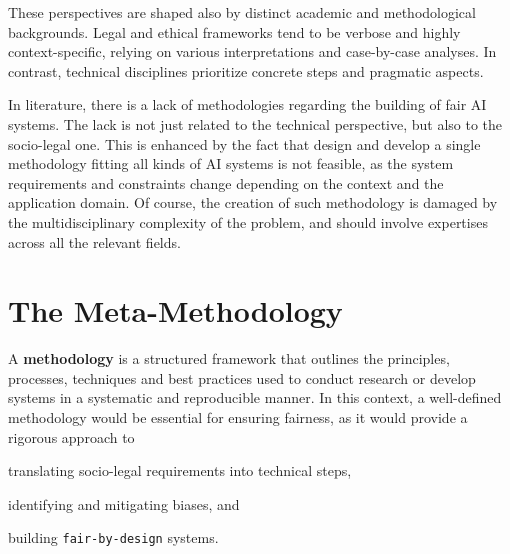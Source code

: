 \documentclass[12pt,a4paper,openright,twoside]{book}
\begin{document}

These perspectives are shaped also by distinct academic and methodological backgrounds.
%
Legal and ethical frameworks tend to be verbose and highly context-specific, relying on various interpretations and case-by-case analyses.
%
In contrast, technical disciplines prioritize concrete steps and pragmatic aspects.


In literature, there is a lack of methodologies regarding the building of fair \ac{AI} systems.
%
The lack is not just related to the technical perspective, but also to the socio-legal one.
%
This is enhanced by the fact that design and develop a single methodology fitting all kinds of \ac{AI} systems is not feasible, as the system requirements and constraints change depending on the context and the application domain.
%
Of course, the creation of such methodology is damaged by the multidisciplinary complexity of the problem, and should involve expertises across all the relevant fields.





% 


\chapter{The Meta-Methodology}%
\label{chap:meta-methodology}


A \textbf{methodology} is a structured framework that outlines the principles, processes, techniques and best practices used to conduct research or develop systems in a systematic and reproducible manner.
%
In this context, a well-defined methodology would be essential for ensuring fairness, as it would provide a rigorous approach to
\begin{enumerate*}[label=(\roman*)]
    \item translating socio-legal requirements into technical steps,
    \item identifying and mitigating biases, and
    \item building \texttt{fair-by-design} systems.
\end{enumerate*}
\end{document}

